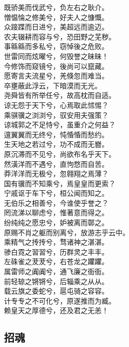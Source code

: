 \documentclass[]{article}
\begin{document}
既骄美而伐武兮，负左右之耿介。\\
憎愠惀之修美兮，好夫人之慷慨。\\
众踥蹀而日进兮，美超远而逾迈。\\
农夫辍耕而容与兮，恐田野之芜秽。\\
事緜緜而多私兮，窃悼後之危败。\\
世雷同而炫曜兮，何毁誉之昧昧！\\
今修饰而窥镜兮，後尚可以竄藏。\\
愿寄言夫流星兮，羌倏忽而难当。\\
卒壅蔽此浮云，下暗漠而无光。\\
尧舜皆有所举任兮，故高枕而自适。\\
谅无怨于天下兮，心焉取此怵惕？\\
乘骐骥之浏浏兮，驭安用夫强策？\\
谅城郭之不足恃兮，虽重介之何益？\\
邅翼翼而无终兮，忳惛惛而愁约。\\
生天地之若过兮，功不成而无嶜。\\
原沉滞而不见兮，尚欲布名乎天下。\\
然潢洋而不遇兮，直怐愗而自苦。\\
莽洋洋而无极兮，忽翱翔之焉薄？\\
国有骥而不知乘兮，焉皇皇而更索？\\
宁戚讴于车下兮，桓公闻而知之。\\
无伯乐之相善兮，今谁使乎誉之？\\
罔流涕以聊虑兮，惟著意而得之。\\
纷纯纯之愿忠兮，妒被离而鄣之。\\
原赐不肖之躯而别离兮，放游志乎云中。\\
乘精气之抟抟兮，骛诸神之湛湛。\\
骖白霓之習習兮，历群灵之丰丰。\\
左硃雀之茇茇兮，右苍龙之躣躣。\\
属雷师之阗阗兮，通飞廉之衙衙。\\
前轻辌之锵锵兮，后辎乘之从从。\\
载云旗之委蛇兮，扈屯骑之容容。\\
计专专之不可化兮，原遂推而为臧。\\
赖皇天之厚德兮，还及君之无恙！

\hypertarget{header-n163}{%
\subsection{招魂}\label{header-n163}}
\end{document}
